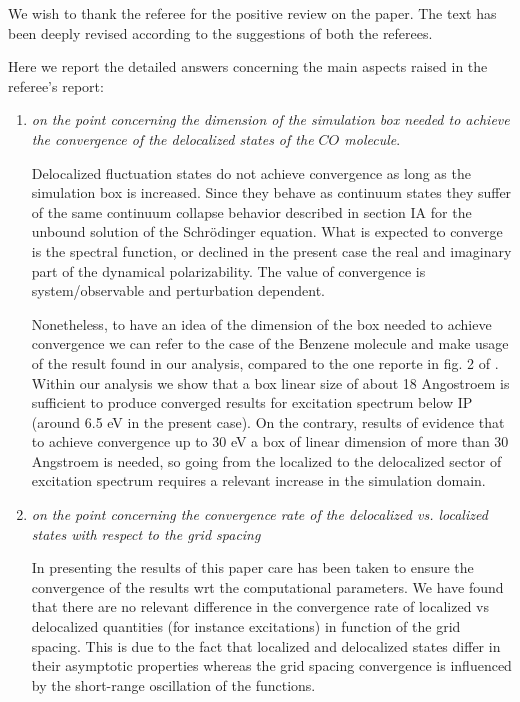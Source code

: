 \documentclass[11pt,a4paper]{article}
\begin{document}
We wish to thank the referee for the positive review on the paper. The text has been deeply revised according to the suggestions of both the referees.

Here we report the detailed answers concerning the main aspects raised in the referee's report:
\begin{enumerate}
  \item \emph{on the point concerning the dimension of the simulation box needed to achieve the convergence of the delocalized states of the $CO$ molecule}.

  Delocalized fluctuation states do not achieve convergence as long as the simulation box is increased. Since they behave as continuum states they suffer of the same continuum collapse behavior described in section IA for the unbound solution of the Schr\"odinger equation. What is expected to converge is the spectral function, or declined in the present case the real and imaginary part of the dynamical polarizability.
  The value of convergence is system/observable and perturbation dependent.

  Nonetheless, to have an idea of the dimension of the box needed to achieve convergence we can refer to the case of the Benzene molecule and make usage
  of the result found in our analysis, compared to the one reporte in fig. 2 of \cite{baroni2008}. Within our analysis we show that a box linear size of about 18 Angostroem is sufficient to produce converged results for excitation spectrum below IP (around 6.5 eV in the present case). On the contrary, results of \cite{baroni2008} evidence that to achieve convergence up to 30 eV a box of linear dimension of more than 30 Angstroem is needed, so going from the localized to the delocalized sector of excitation spectrum requires a relevant increase in the simulation domain.

  \item \emph{on the point concerning the convergence rate of the delocalized vs. localized states with respect
  to the grid spacing}

 In presenting the results of this paper care has been taken to ensure the convergence of the results wrt the computational parameters. We have found that there are no relevant difference in the convergence rate of localized vs delocalized quantities (for instance excitations) in function of the grid spacing. This is due to the fact that localized and delocalized states differ in their asymptotic properties whereas the grid spacing convergence is influenced by the short-range oscillation of the functions.


\end{enumerate}
\end{document}
